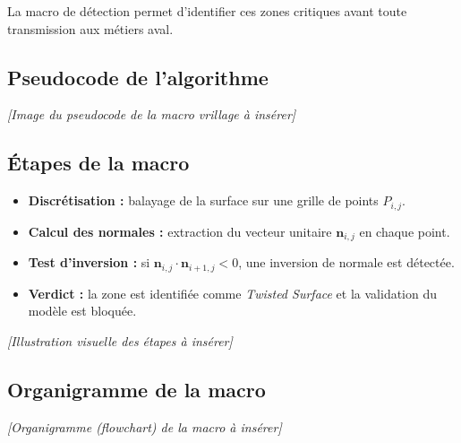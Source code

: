La macro de détection permet d'identifier ces zones critiques avant toute transmission aux métiers aval.

\subsection{Pseudocode de l'algorithme}

\begin{center}
    \textit{[Image du pseudocode de la macro vrillage à insérer]}
\end{center}

\subsection{Étapes de la macro}

\begin{itemize}
    \item[�] \textbf{Discrétisation :} balayage de la surface sur une grille de points $P_{i,j}$.
    \item[�] \textbf{Calcul des normales :} extraction du vecteur unitaire $\mathbf{n}_{i,j}$ en chaque point.
    \item[�] \textbf{Test d'inversion :} si $\mathbf{n}_{i,j} \cdot \mathbf{n}_{i+1,j} < 0$, une inversion de normale est détectée.
    \item[�] \textbf{Verdict :} la zone est identifiée comme \textit{Twisted Surface} et la validation du modèle est bloquée.
\end{itemize}

\begin{center}
    \textit{[Illustration visuelle des étapes à insérer]}
\end{center}

\subsection{Organigramme de la macro}

\begin{center}
    \textit{[Organigramme (flowchart) de la macro à insérer]}
\end{center}

